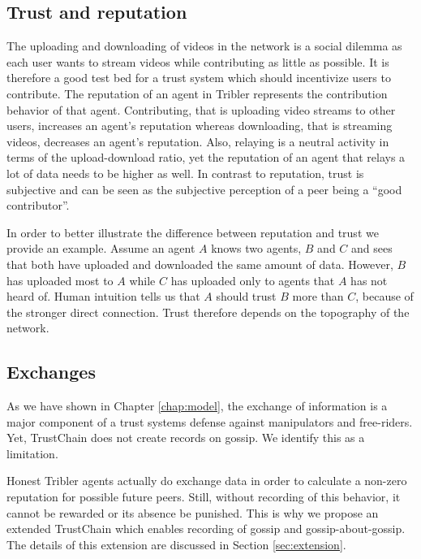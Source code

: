 \subsection{Trust and reputation}
The uploading and downloading of videos in the network is a social dilemma as each user wants to 
stream videos while contributing as little as possible. It is therefore a good test bed for a trust 
system which should incentivize users to contribute. The reputation of an agent in Tribler represents the 
contribution behavior of that agent. Contributing, that is uploading video streams to other users,
increases an agent's reputation whereas downloading, that is streaming videos, decreases an agent's 
reputation. Also, relaying is a neutral activity in terms of the upload-download ratio, yet the 
reputation of an agent that relays a lot of data needs to be higher as well. In contrast to 
reputation, trust is subjective and can be seen as the subjective perception of a peer being a 
``good contributor''. 

In order to better illustrate the difference between reputation and trust we provide an example.
Assume an agent $A$ knows two agents, $B$ and $C$ and sees that both have uploaded and downloaded 
the same amount of data. However, $B$ has uploaded most to $A$ while $C$ has uploaded only to 
agents that $A$ has not heard of. Human intuition tells us that $A$ should trust $B$ more than $C$, 
because of the stronger direct connection. Trust therefore depends on the topography of the network.


\subsection{Exchanges}
As we have shown in Chapter \ref{chap:model}, the exchange of information is a major component of a trust 
systems defense against manipulators and free-riders. Yet, TrustChain does not create records on 
gossip. We identify this as a limitation. 

Honest Tribler agents actually do exchange data in order to calculate a non-zero reputation for possible
future peers. Still, without recording of this behavior, it cannot be rewarded or its absence be punished. 
This is why we propose an extended TrustChain which enables recording of gossip and gossip-about-gossip. 
The details of this extension are discussed in Section \ref{sec:extension}.


